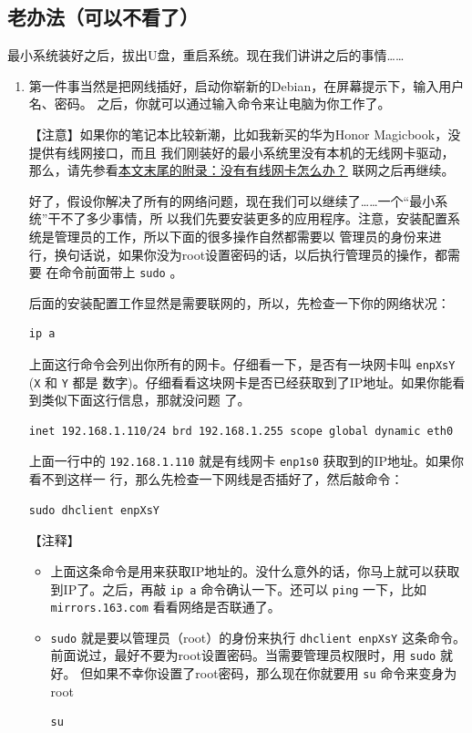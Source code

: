 \documentclass{wx672ctexart} \usepackage{hyperref}
\begin{document}
\subsection{老办法（可以不看了）}
\label{sec:org44bac5f}
最小系统装好之后，拔出U盘，重启系统。现在我们讲讲之后的事情……
\begin{enumerate}
\item 第一件事当然是把网线插好，启动你崭新的Debian，在屏幕提示下，输入用户名、密码。
之后，你就可以通过输入命令来让电脑为你工作了。

【注意】如果你的笔记本比较新潮，比如我新买的华为Honor Magicbook，没提供有线网接口，而且
我们刚装好的最小系统里没有本机的无线网卡驱动，那么，请先参看\hyperref[sec:orgd858525]{本文末尾的附录：没有有线网卡怎么办？}
联网之后再继续。

好了，假设你解决了所有的网络问题，现在我们可以继续了……一个“最小系统”干不了多少事情，所
以我们先要安装更多的应用程序。注意，安装配置系统是管理员的工作，所以下面的很多操作自然都需要以
管理员的身份来进行，换句话说，如果你没为root设置密码的话，以后执行管理员的操作，都需要
在命令前面带上 \texttt{sudo} 。

后面的安装配置工作显然是需要联网的，所以，先检查一下你的网络状况：
\begin{verbatim}
ip a
\end{verbatim}


上面这行命令会列出你所有的网卡。仔细看一下，是否有一块网卡叫 \texttt{enpXsY} (\texttt{X} 和 \texttt{Y} 都是
数字)。仔细看看这块网卡是否已经获取到了IP地址。如果你能看到类似下面这行信息，那就没问题
了。
\begin{verbatim}
inet 192.168.1.110/24 brd 192.168.1.255 scope global dynamic eth0
\end{verbatim}

上面一行中的 \texttt{192.168.1.110} 就是有线网卡 \texttt{enp1s0} 获取到的IP地址。如果你看不到这样一
行，那么先检查一下网线是否插好了，然后敲命令：
\begin{verbatim}
sudo dhclient enpXsY
\end{verbatim}

【注释】
\begin{itemize}
\item 上面这条命令是用来获取IP地址的。没什么意外的话，你马上就可以获取到IP了。之后，再敲
\texttt{ip a} 命令确认一下。还可以 \texttt{ping} 一下，比如 \texttt{mirrors.163.com} 看看网络是否联通了。
\item \texttt{sudo} 就是要以管理员（root）的身份来执行 \texttt{dhclient enpXsY} 这条命令。前面说过，最好不要为root设置密码。当需要管理员权限时，用 \texttt{sudo} 就好。
但如果不幸你设置了root密码，那么现在你就要用 \texttt{su} 命令来变身为root
\begin{verbatim}
su
\end{verbatim}


\end{itemize}
\end{enumerate}
\end{document}
